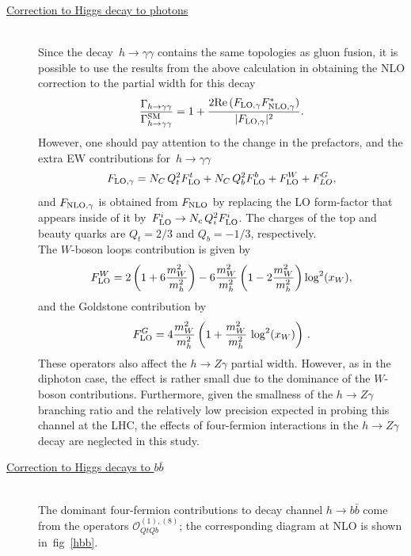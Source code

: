 \begin{description}
		\item [\underline{Correction to Higgs decay to photons }] \hfill  \vspace{0.3cm} \\
	Since the decay~$ h \to \gamma \gamma$ contains the same topologies as gluon fusion, it is possible to use the results from the above calculation in obtaining the NLO correction to the partial width for this decay
		\begin{equation}
			\frac{\Gamma_{h\to \gamma\gamma}}{\Gamma_{h\to \gamma\gamma}^{\mathrm{SM}}}= 1+ \frac{2 \mbox{Re}\,(F_{\textrm{LO}, \gamma} F^*_{\textrm{NLO},\gamma})}{  |F_{\textrm{LO}, \gamma}|^2} .
		\end{equation}
		However, one should pay attention to the change in the prefactors, and the extra EW contributions for~$ h \to \gamma \gamma$ 
		\begin{equation}
			F_{\textrm{LO}, \gamma}= N_C\,Q_t^2 F_{\textrm{LO}}^t+ N_C\,Q_b^2 F_{\textrm{LO}}^b+F_{\textrm{LO}}^W+ F^G_{LO} ,
		\end{equation}
		and $F_{\textrm{NLO}, \gamma}$ is obtained from $F_{\textrm{NLO}}$ by replacing the LO form-factor that appears inside of it by~$ F_{\textrm{LO}}^i \to N_c \,Q_i^2 F_{\textrm{LO}}^i$. The charges of the top and beauty quarks are $Q_t=2/3$ and $Q_b=-1/3$, respectively.\\ The $W$-boson loops contribution is given by
		\begin{equation}
			F_{\textrm{LO}}^W= 2 \left(1+6 \frac{m_W^2}{m_h^2}\right)-6 \frac{m_W^2}{  m_h^2} \left(1-2  \frac{m_W^2}{m_h^2}\right) \log^2(x_W),
		\end{equation}
		and the Goldstone contribution by
		\begin{equation}
			F_{\textrm{LO}}^G=4\frac{m_W^2}{m_h^2} \left( 1+ \frac{m_W^2}{m_h^2} \,\log^2(x_W) \right)\,.
		\end{equation}
		These operators also affect the $h\to Z\gamma$ partial width. However,  as in the diphoton case, the effect is rather small due to the dominance of the $W$-boson contributions.  Furthermore, given the smallness of the $h\to Z\gamma$ branching ratio and the relatively low precision expected in probing this channel at the LHC, the effects of four-fermion interactions in the $ h \to Z\gamma$ decay are neglected in this study.
		\item [\underline{Correction to Higgs decays to $b \bar{b}$ }] \hfill  \vspace{0.3cm} \\
		The dominant four-fermion contributions to decay channel $h \to b\bar b$ come from the operators  $\mathcal{O}_{QtQb}^{(1),(8)}$; the corresponding diagram at NLO is shown in~fig~\ref{hbb}. 

\end{description}
